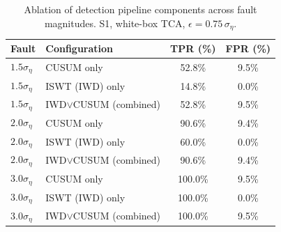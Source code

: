 \begin{table}[t]
\centering
\caption{Ablation of detection pipeline components across fault magnitudes.
S1, white-box TCA, $\epsilon = 0.75\,\sigma_\eta$.}
\label{tab:iwd_ablation}
\small
\begin{tabular}{@{}llcc@{}}
\toprule
\textbf{Fault} & \textbf{Configuration} & \textbf{TPR (\%)} & \textbf{FPR (\%)} \\
\midrule
$1.5\sigma_\eta$ & CUSUM only                & 52.8\% & 9.5\% \\
$1.5\sigma_\eta$ & ISWT (IWD) only           & 14.8\% & 0.0\% \\
$1.5\sigma_\eta$ & IWD$\vee$CUSUM (combined) & 52.8\% & 9.5\% \\
\midrule
$2.0\sigma_\eta$ & CUSUM only                & 90.6\% & 9.4\% \\
$2.0\sigma_\eta$ & ISWT (IWD) only           & 60.0\% & 0.0\% \\
$2.0\sigma_\eta$ & IWD$\vee$CUSUM (combined) & 90.6\% & 9.4\% \\
\midrule
$3.0\sigma_\eta$ & CUSUM only                & 100.0\% & 9.5\% \\
$3.0\sigma_\eta$ & ISWT (IWD) only           & 100.0\% & 0.0\% \\
$3.0\sigma_\eta$ & IWD$\vee$CUSUM (combined) & 100.0\% & 9.5\% \\
\bottomrule
\end{tabular}
\end{table}